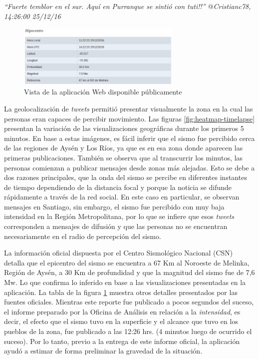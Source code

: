 \textit{``Fuerte temblor en el sur. Aquí en Purranque se sintió con tuti!!'' $@$Cristianc78, 14:26:00 25/12/16}

	\begin{figure}[!h]
	  \centering
	  \includegraphics[trim={0 0 0 0}, clip, width=0.7\textwidth]{imagenes/img-25Dic-Hipocentro.png}
	  \caption{Vista de la aplicación Web disponible públicamente}
		\label{fig:25dic-hipocentro}
	\end{figure}
	
	La geolocalización de \textit{tweets} permitió presentar visualmente la zona en la cual las personas eran capaces de percibir movimiento. Las figuras \ref{fig:heatmap-timelapse} presentan la variación de las visualizaciones geográficas durante los primeros 5 minutos. En base a estas imágenes, es fácil inferir que el sismo fue percibido cerca de las regiones de Aysén y Los Ríos, ya que es en esa zona donde aparecen las primeras publicaciones. También se observa que al transcurrir los minutos, las personas comienzan a publicar mensajes desde zonas más alejadas. Esto se debe a dos razones principales, que la onda del sismo se percibe en diferentes instantes de tiempo dependiendo de la distancia focal y porque la noticia se difunde rápidamente a través de la red social. En este caso en particular, se observan mensajes en Santiago, sin embargo, el sismo fue percibido con muy baja intensidad en la Región Metropolitana, por lo que se infiere que esos \textit{tweets} corresponden a mensajes de difusión y que las personas no se encuentran necesariamente en el radio de percepción del sismo.
		
	La información oficial dispuesta por el Centro Sismológico Nacional (CSN) detalla que el epicentro del sismo se encuentra a 67 Km al Noroeste de Melinka, Región de Aysén, a 30 Km de profundidad y que la magnitud del sismo fue de 7,6 Mw. Lo que confirma lo inferido en base a las visualizaciones presentadas en la aplicación. La tabla de la figura \ref{fig:25dic-hipocentro} muestra otros detalles presentados por las fuentes oficiales. 
	Mientras este reporte fue publicado a pocos segundos del suceso, el informe preparado por la Oficina de Análisis en relación a la {\em intensidad}, es decir, el efecto que el sismo tuvo en la superficie y el alcance que tuvo en los pueblos de la zona, fue publicado a las 12:26 hrs. (4 minutos luego de ocurrido el suceso).
	Por lo tanto, previo a la entrega de este informe oficial, la aplicación ayudó a estimar de forma preliminar la gravedad de la situación. 
	
